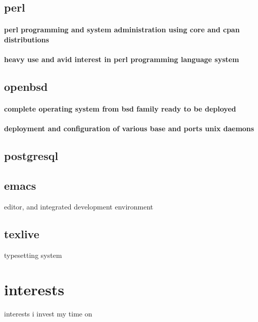 \documentclass{article}
\begin{document}
\subsection{perl}
\paragraph{perl programming and system administration using core and cpan distributions}
\paragraph{heavy use and avid interest in perl programming language system}
\subsection{openbsd}
\paragraph{complete operating system from bsd family ready to be deployed}
\paragraph{deployment and configuration of various base and ports unix daemons}
\subsection{postgresql}
\subsection{emacs}
editor, and integrated development environment
\subsection{texlive}
typesetting system
\section{interests}
interests i invest my time on
\end{document}
